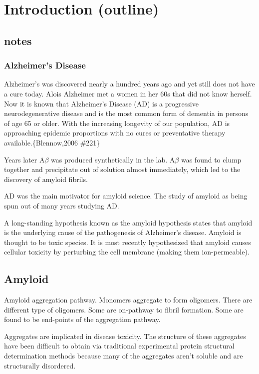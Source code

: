 \chapter{Introduction (outline)}
\section{notes}


\subsection{Alzheimer's Disease}
\begin{outline}
\1 Alzheimer's was discovered nearly a hundred years ago and yet still does not have a cure today.  Alois Alzheimer met a women in her 60s that did not know herself. Now it is known that Alzheimer's Disease (AD) is a progressive neurodegenerative disease and is the most common form of dementia in persons of age 65 or older. With the increasing longevity of our population, AD is approaching epidemic proportions with no cures or preventative therapy available.\{Blennow,2006 \#221\}

\1 Years later A$\beta$ was produced synthetically in the lab. A$\beta$ was found to clump together and precipitate out of solution almost immediately, which led to the discovery of amyloid fibrils.

\1 AD was the main motivator for amyloid science. The study of amyloid as being spun out of many years studying AD.

\1 A long-standing hypothesis known as the amyloid hypothesis states that amyloid is the underlying cause of the pathogenesis of Alzheimer's disease.  Amyloid is thought to be toxic species.  It is most recently hypothesized that amyloid causes cellular toxicity by perturbing the cell membrane (making them ion-permeable).
\end{outline}

\section{Amyloid}
\begin{outline}
\1 Amyloid aggregation pathway. Monomers aggregate to form oligomers. There are different type of oligomers. Some are on-pathway to fibril formation. Some are found to be end-points of the aggregation pathway. 

\1 Aggregates are implicated in disease toxicity.  The structure of these aggregates have been difficult to obtain via traditional experimental protein structural determination methods because many of the aggregates aren't soluble and are structurally disordered.
\end{outline}
    
